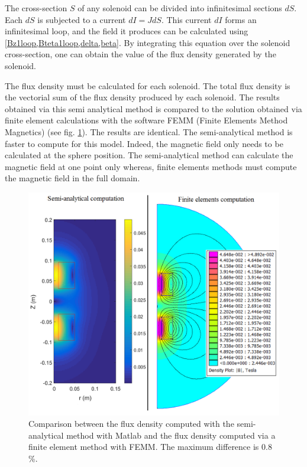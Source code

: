 \documentclass[letterpaper, 10 pt, conference]{ieeeconf}  %
\begin{document}
The cross-section $S$ of any solenoid can be divided into infinitesimal sections $dS$. Each $dS$ is subjected to a current $dI=JdS$. This current $dI$ forms an infinitesimal loop, and the field it produces can be calculated using \cref{Bz1loop,Bteta1loop,delta,beta}. By integrating this equation over the solenoid cross-section, one can obtain the value of the flux density generated by the solenoid.\par
The flux density must be calculated for each solenoid. The total flux density is the vectorial sum of the flux density produced by each solenoid. The results obtained via this semi analytical method is compared to the solution obtained via finite element calculations with the software FEMM (Finite Elements Method Magnetics)\cite{femm} (see fig. \ref{Femm_matlab_comparison}). The results are identical. The semi-analytical method is faster to compute for this model. Indeed, the magnetic field only needs to be calculated at the sphere position. The semi-analytical method can calculate the magnetic field at one point only whereas, finite elements methods must compute the magnetic field in the full domain.

\begin{figure}
  \includegraphics[width=\linewidth]{Femm_matlab_comparison.png}
  \caption{Comparison between the flux density computed with the semi-analytical method with {\sc Matlab} and the flux density computed via a finite element method with FEMM. The maximum difference is 0.8 \%.}
  \label{Femm_matlab_comparison}
\end{figure}
\end{document}
